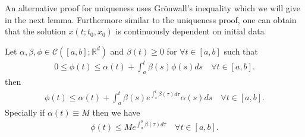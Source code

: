 \begin{remark}
 An alternative proof for uniqueness uses  Grönwall's inequality
 which we will give in the next lemma. Furthermore similar to the uniqueness proof, one can 
 obtain that the solution $x(t; t_{0},x_{0})$ is continuously dependent on initial data
\end{remark}
\begin{lemma}\label{gronwall_lemma}
  Let $\alpha ,\beta ,\phi  \in  \mathcal{C}([a,b];\mathbb{R}^{d} )$  and $\beta (t) \ge 0$ for $\forall t \in [a,b]$ 
  such that 
  \begin{align*}
    0 \le  \phi(t) \le  \alpha(t) + \int_a^{t} \beta(s)\phi(s) ds \quad \forall t \in [a,b] 
  .\end{align*}
  then 
  \begin{align*}
    \phi(t) \le  \alpha(t) + \int_a^{t}  \beta(s) e^{\int_s^{t} \beta(\tau ) d\tau  }  \alpha(s) ds \quad \forall t \in [a,b]
  .\end{align*}
  Specially if $\alpha(t) \equiv M$ then we have 
  \begin{align*}
    \phi(t) \le  M e^{\int_a^{b} \beta(\tau )d\tau  }  \quad \forall t \in [a,b]
  .\end{align*}
\end{lemma}

